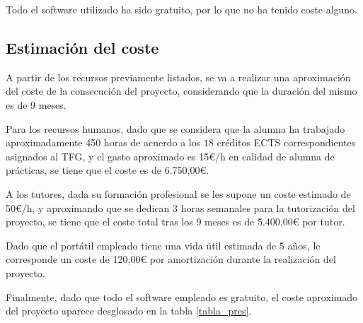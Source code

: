 Todo el software utilizado ha sido gratuito, por lo que no ha tenido coste alguno.

\subsection{Estimación del coste}

A partir de los recursos previamente listados, se va a realizar una aproximación del coste de la consecución del proyecto, considerando que la duración del mismo es de 9 meses.

Para los recursos humanos, dado que se considera que la alumna ha trabajado aproximadamente 450 horas de acuerdo a los $18$ créditos ECTS correspondientes asignados al TFG, y el gasto aproximado es 15€/h en calidad de alumna de prácticas, se tiene que el coste es de 6.750,00€.

A los tutores, dada su formación profesional se les supone un coste estimado de 50€/h, y aproximando que se dedican 3 horas semanales para la tutorización del proyecto, se tiene que el coste total tras los 9 meses es de 5.400,00€ por tutor.

Dado que el portátil empleado tiene una vida útil estimada de 5 años, le corresponde un coste de 120,00€ por amortización durante la realización del proyecto.

Finalmente, dado que todo el software empleado es gratuito, el coste aproximado del proyecto aparece desglosado en la tabla \ref{tabla_pres}.

